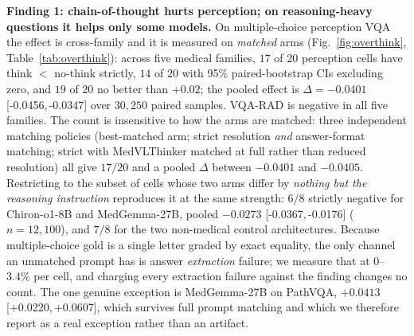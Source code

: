 \documentclass[conference]{IEEEtran}
\newcommand{\ci}[2]{{\footnotesize[#1,\,#2]}}
\begin{document}
\textbf{Finding 1: chain-of-thought hurts perception; on reasoning-heavy questions it helps only some models.} On multiple-choice perception VQA the effect is cross-family and it is measured on \emph{matched} arms (Fig.~\ref{fig:overthink}, Table~\ref{tab:overthink}): across five medical families, $17$ of $20$ perception cells have think $<$ no-think strictly, $14$ of $20$ with 95\% paired-bootstrap CIs excluding zero, and $19$ of $20$ no better than $+0.02$; the pooled effect is $\Delta{=}-0.0401$ \ci{-0.0456}{-0.0347} over $30{,}250$ paired samples. VQA-RAD is negative in all five families. The count is insensitive to how the arms are matched: three independent matching policies (best-matched arm; strict resolution \emph{and} answer-format matching; strict with MedVLThinker matched at full rather than reduced resolution) all give $17/20$ and a pooled $\Delta$ between $-0.0401$ and $-0.0405$. Restricting to the subset of cells whose two arms differ by \emph{nothing but the reasoning instruction} reproduces it at the same strength: $6/8$ strictly negative for Chiron-o1-8B and MedGemma-27B, pooled $-0.0273$ \ci{-0.0367}{-0.0176} ($n{=}12{,}100$), and $7/8$ for the two non-medical control architectures. Because multiple-choice gold is a single letter graded by exact equality, the only channel an unmatched prompt has is answer \emph{extraction} failure; we measure that at $0$--$3.4\%$ per cell, and charging every extraction failure against the finding changes no count. The one genuine exception is MedGemma-27B on PathVQA, $+0.0413$ \ci{+0.0220}{+0.0607}, which survives full prompt matching and which we therefore report as a real exception rather than an artifact.
\end{document}
